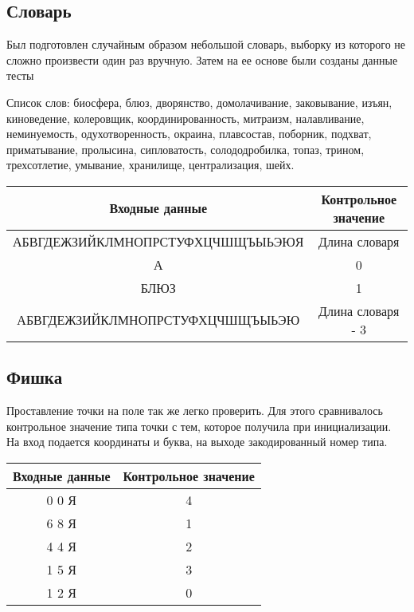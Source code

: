 \documentclass[a4paper,14pt]{article}
\begin{document}
	\subsection{Словарь}
	Был подготовлен случайным образом небольшой словарь, выборку из которого не сложно произвести один раз вручную. Затем на ее основе были созданы данные тесты
	
	Список слов: биосфера, блюз, дворянство, домолачивание, заковывание, изъян, киноведение, колеровщик, координированность, митраизм, налавливание, неминуемость, одухотворенность, окраина, плавсостав, поборник, подхват, приматывание, пролысина, сипловатость, солододробилка, топаз, трином, трехсотлетие, умывание, хранилище, централизация, шейх.
	\begin{table}[!h]
		\begin{center}
		\begin{flushleft}
		\end{flushleft}
		
		\begin{tabular}{|c|c|}
			\hline
			         Входные данные          & Контрольное значение \\ \hline
			АБВГДЕЖЗИЙКЛМНОПРСТУФХЦЧШЩЪЫЬЭЮЯ &    Длина словаря     \\ \hline
			               А                 &          0           \\ \hline
			              БЛЮЗ               &          1           \\ \hline
			АБВГДЕЖЗИЙКЛМНОПРСТУФХЦЧШЩЪЫЬЭЮ  &  Длина словаря - 3   \\ \hline
		\end{tabular}
		\end{center}
	\end{table}

	\subsection{Фишка}
	Проставление точки на поле так же легко проверить. Для этого сравнивалось контрольное значение типа точки с тем, которое получила при инициализации. На вход подается координаты и буква, на выходе закодированный номер типа.
	
	\begin{table}[!h]
		\begin{center}
			\begin{tabular}{|c|c|}
				\hline
				Входные данные          & Контрольное значение \\ \hline
				0 0 Я& 4 \\ \hline
				6 8 Я& 1 \\ \hline
				4 4 Я& 2 \\ \hline
				1 5 Я& 3 \\ \hline
				1 2 Я& 0 \\ \hline
			\end{tabular}
		\end{center}
	\end{table}
\end{document}
